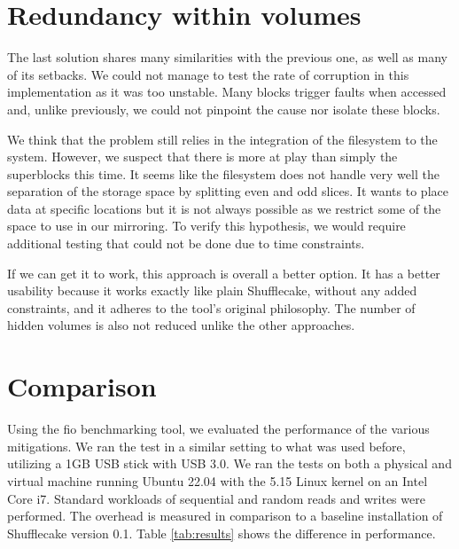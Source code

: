 \documentclass[a4paper,11pt,oneside]{report}
\begin{document}
\section{Redundancy within volumes}

The last solution shares many similarities with the previous one, as well as many of its setbacks. We could not manage to test the rate of corruption in this implementation as it was too unstable. Many blocks trigger faults when accessed and, unlike previously, we could not pinpoint the cause nor isolate these blocks. 

We think that the problem still relies in the integration of the filesystem to the system. However, we suspect that there is more at play than simply the superblocks this time. It seems like the filesystem does not handle very well the separation of the storage space by splitting even and odd slices. It wants to place data at specific locations but it is not always possible as we restrict some of the space to use in our mirroring. To verify this hypothesis, we would require additional testing that could not be done due to time constraints.

If we can get it to work, this approach is overall a better option. It has a better usability because it works exactly like plain Shufflecake, without any added constraints, and it adheres to the tool's original philosophy. The number of hidden volumes is also not reduced unlike the other approaches.

\section{Comparison}

Using the fio benchmarking tool\cite{fio}, we evaluated the performance of the various mitigations. We ran the test in a similar setting to what was used before, utilizing a 1GB USB stick with USB 3.0. We ran the tests on both a physical and virtual machine running Ubuntu 22.04 with the 5.15 Linux kernel on an Intel Core i7. Standard workloads of sequential and random reads and writes were performed. The overhead is measured in comparison to a baseline installation of Shufflecake version 0.1. Table \ref{tab:results} shows the difference in performance.
\end{document}

